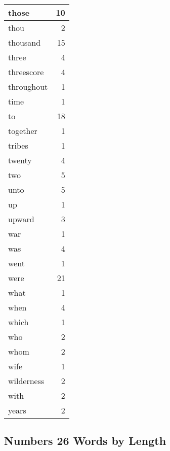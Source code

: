 \begin{center}
\begin{longtable}{l|r}
those & 10\\ \hline 
thou & 2\\ \hline 
thousand & 15\\ \hline 
three & 4\\ \hline 
threescore & 4\\ \hline 
throughout & 1\\ \hline 
time & 1\\ \hline 
to & 18\\ \hline 
together & 1\\ \hline 
tribes & 1\\ \hline 
twenty & 4\\ \hline 
two & 5\\ \hline 
unto & 5\\ \hline 
up & 1\\ \hline 
upward & 3\\ \hline 
war & 1\\ \hline 
was & 4\\ \hline 
went & 1\\ \hline 
were & 21\\ \hline 
what & 1\\ \hline 
when & 4\\ \hline 
which & 1\\ \hline 
who & 2\\ \hline 
whom & 2\\ \hline 
wife & 1\\ \hline 
wilderness & 2\\ \hline 
with & 2\\ \hline 
years & 2\\ \hline 
\end{longtable}
\end{center}





\subsection{Numbers 26 Words by Length}


\normalsize
 
